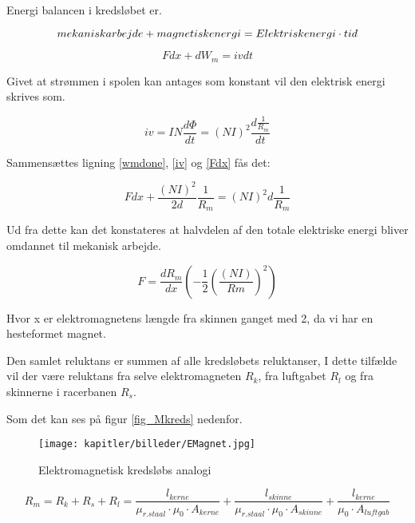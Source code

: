 Energi balancen i kredsløbet er.

\begin{equation}
\begin{centering}
mekanisk arbejde + magnetisk energi =Elektrisk energi \cdot tid
\end{centering}
\end{equation}

\begin{equation}
F dx + dW_m = iv dt
\label{Fdx}
\end{equation}

Givet at strømmen i spolen kan antages som konstant vil den elektrisk energi skrives som.

\begin{equation}
iv=IN \frac{d\Phi}{dt} =(NI)^2  \frac{d\frac{1}{R_m}}{dt}
\label{iv}
\end{equation}


Sammensættes ligning \ref{wmdone}, \ref{iv} og \ref{Fdx} fås det:

\begin{equation}
F dx+\frac{(NI)^2}{2d} \frac{1}{R_m} =(NI)^2  d \frac{1}{R_m}
\end{equation}

Ud fra dette kan det konstateres at halvdelen af den totale elektriske energi bliver omdannet til mekanisk arbejde.

\begin{equation}
F = \frac{dR_m}{dx} (-\frac{1}{2} (\frac{(NI)}{Rm} )^2 )
\end{equation}

Hvor x er elektromagnetens længde fra skinnen ganget med 2, da vi har en hesteformet magnet.

Den samlet reluktans er summen af alle kredsløbets reluktanser, I dette tilfælde vil der være reluktans fra selve elektromagneten $R_k$, fra luftgabet $R_l$ og fra skinnerne i racerbanen $R_s$.

Som det kan ses på figur \ref{fig_Mkreds} nedenfor.

\begin{figure}[ht]
	\label{fig:Mkreds}
	\centering
	\texttt{[image: kapitler/billeder/EMagnet.jpg]}
	\caption{Elektromagnetisk kredsløbs analogi}
	\end{figure}


\begin{equation}
\label{rm1}
R_m =R_k + R_s + R_l = \frac{l_{kerne}}{\mu_{r.staal} \cdot \mu_0 \cdot A_{kerne} } + \frac{l_{skinne}}{\mu_{r.staal} \cdot \mu_0 \cdot A_{skinne} }  + \frac{l_{kerne}}{\mu_0 \cdot A_{luftgab} }
\end{equation}

